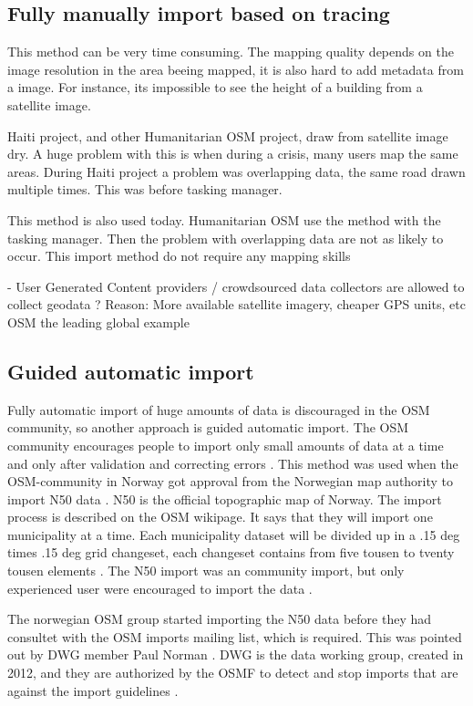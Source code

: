 \subsection{Fully manually import based on tracing}
This method can be very time consuming. The mapping quality depends on the image resolution in the area beeing mapped, it is also hard to add metadata from a image. For instance, its impossible to see the height of a building from a satellite image. 

Haiti project, and other Humanitarian OSM project, draw from satellite image dry. A huge problem with this is when during a crisis, many users map the same areas. During Haiti project a problem was overlapping data, the same road drawn multiple times. This was before tasking manager. 

This method is also used today. Humanitarian OSM use the method with the tasking manager. Then the problem with overlapping data are not as likely to occur.  This import method do not require any mapping skills

	- User Generated Content providers / crowdsourced data collectors are allowed to collect geodata
		? Reason: More available satellite imagery, cheaper GPS units, etc
OSM the leading global example %



\subsection{Guided automatic import}\label{guidedautoimp}
Fully automatic import of huge amounts of data is discouraged in the OSM community, so another approach is guided automatic import. The OSM community encourages people to import only small amounts of data at a time and only after validation and correcting errors \cite{Mehus2014}. This method was used when the OSM-community in Norway got approval from the Norwegian map authority to import N50 data \cite{Kihle2014}. N50 is the official topographic map of Norway. The import process is described on the OSM wikipage. It says that they will import one municipality at a time. Each municipality dataset will be divided up in a .15 deg times .15 deg grid changeset, each changeset contains from five tousen to tventy tousen elements \cite{OSMN502014}. The N50 import was an community import, but only experienced user were encouraged to import the data \cite{Mehus2014}. 

The norwegian OSM group started importing the N50 data before they had consultet with the OSM imports mailing list, which is required. This was pointed out by DWG member Paul Norman \cite{Mehus2014}.  DWG is the data working group, created in 2012, and they are authorized by the OSMF to detect and stop imports that are against the import guidelines \cite{OSMDWG}. 

